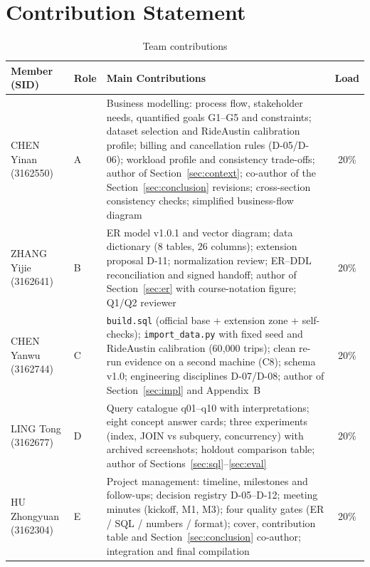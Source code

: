 \section{Contribution Statement}
\label{app:contribution}

\begin{table}[H]  %
\centering\small
\begin{tabular}{lp{1.2cm}p{7.6cm}c}
\toprule
Member (SID) & Role & Main Contributions & Load \\
\midrule
CHEN Yinan (3162550)  & A & Business modelling: process flow, stakeholder needs, quantified goals G1--G5 and constraints; dataset selection and RideAustin calibration profile; billing and cancellation rules (D-05/D-06); workload profile and consistency trade-offs; author of Section~\ref{sec:context}; co-author of the Section~\ref{sec:conclusion} revisions; cross-section consistency checks; simplified business-flow diagram & 20\% \\
\addlinespace
ZHANG Yijie (3162641) & B & ER model v1.0.1 and vector diagram; data dictionary (8 tables, 26 columns); extension proposal D-11; normalization review; ER--DDL reconciliation and signed handoff; author of Section~\ref{sec:er} with course-notation figure; Q1/Q2 reviewer & 20\% \\
\addlinespace
CHEN Yanwu (3162744)  & C & \texttt{build.sql} (official base + extension zone + self-checks); \texttt{import\_data.py} with fixed seed and RideAustin calibration (60{,}000 trips); clean re-run evidence on a second machine (C8); schema v1.0; engineering disciplines D-07/D-08; author of Section~\ref{sec:impl} and Appendix~B & 20\% \\
\addlinespace
LING Tong (3162677)   & D & Query catalogue q01--q10 with interpretations; eight concept answer cards; three experiments (index, JOIN vs subquery, concurrency) with archived screenshots; holdout comparison table; author of Sections~\ref{sec:sql}--\ref{sec:eval} & 20\% \\
\addlinespace
HU Zhongyuan (3162304)& E & Project management: timeline, milestones and follow-ups; decision registry D-05--D-12; meeting minutes (kickoff, M1, M3); four quality gates (ER / SQL / numbers / format); cover, contribution table and Section~\ref{sec:conclusion} co-author; integration and final compilation & 20\% \\
\bottomrule
\end{tabular}
\caption{Team contributions}
\label{tab:contribution}
\end{table}
